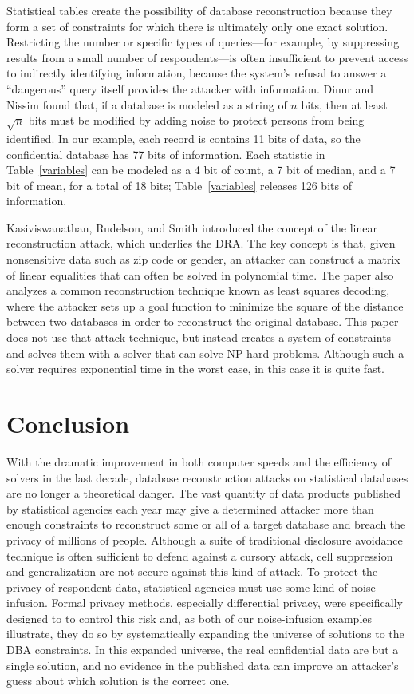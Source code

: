 \documentclass[runningheads]{llncs}
\begin{document}
Statistical tables create the possibility of database reconstruction
because they form a set of constraints for which there is ultimately
only one exact solution. Restricting the number or specific types of
queries---for example, by suppressing results from a small number of
respondents---is often insufficient to prevent access to indirectly
identifying information, because the system's refusal to answer a
``dangerous'' query itself provides the attacker with information.
Dinur and Nissim found that, if a database is modeled as a string of
$n$ bits, then at least $\sqrt{n}$ bits must be modified by adding
noise to protect persons from being identified. In our example, each
record is contains 11 bits of data, so the confidential database has
77 bits of information. Each statistic in Table~\ref{variables}
can be modeled as a 4 bit of count, a 7 bit of median, and a 7 bit of
mean, for a total of 18 bits; Table~\ref{variables} releases 126 bits
of information.

Kasiviswanathan, Rudelson, and Smith\cite{Kasiviswanathan:2013:PLR:2627817.2627919} introduced
the concept of the linear reconstruction attack, which underlies the  DRA. The key concept is that,
given nonsensitive data such as zip code or gender, an attacker
can construct a matrix of linear equalities that can often be solved
in polynomial time. The paper also analyzes a common reconstruction
technique known as least squares decoding, where the attacker sets up
a goal function to minimize the square of the distance between two
databases in order to reconstruct the original database. This paper
does not use that attack technique, but instead creates a system of
constraints and solves them with a solver that can solve NP-hard
problems. Although such a solver requires exponential time in the
worst case, in this case it is quite fast.

\section{Conclusion}

With the dramatic improvement in both computer speeds and the
efficiency of solvers in the
last decade, database reconstruction attacks on statistical databases are no longer a 
theoretical danger. The vast quantity of data products published by
statistical agencies each year may give a determined attacker 
more than enough constraints to reconstruct some or all of a target database and
breach the privacy of millions of people. Although a suite of traditional
disclosure avoidance technique is often sufficient to defend against a
cursory attack, cell suppression and generalization are not secure
against this kind of 
attack. To protect the privacy of respondent data, statistical
agencies must use some kind of noise infusion. 
Formal privacy methods, especially differential privacy, were specifically
designed to to control this risk and, as both of our noise-infusion examples
illustrate, they do so by systematically expanding the universe of solutions
to the DBA constraints. In this expanded universe, the real confidential data
are but a single solution, and no evidence in the published data can improve 
an attacker's guess about which solution is the correct one.
\end{document}
